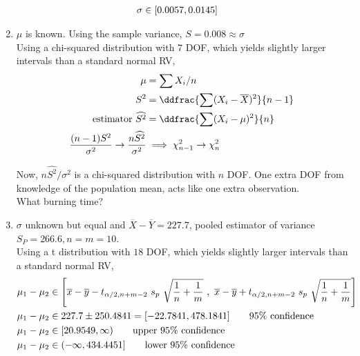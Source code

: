 \begin{enumerate}
	\begin{subequations}
		\begin{align}
			\sigma &\in [0.0057, 0.0145]
		\end{align}\\
	\end{subequations}

	\item  $ \mu $ is known. Using the sample variance, $ S = 0.008 \approx \sigma $\\
	Using a chi-squared distribution with $ 7 $ DOF, which yields slightly larger intervals than a standard normal RV,\\
	
	\begin{subequations}
		\begin{align}
			\mu &= \sum X_i / n \nonumber \\
			S^2 &= \ddfrac{\sum (X_i - \overline{X})^2}{n-1} \nonumber \\
			\text{estimator } \widehat{S^2} &= \ddfrac{\sum (X_i - \mu)^2}{n} \\
			\frac{(n-1)S^2}{\sigma^2} \to \frac{n\widehat{S^2}}{\sigma^2} &\implies \chi^2_{n-1} \to \chi^2_{n}
		\end{align}\\
	\end{subequations}
	
	Now, $ n \widehat{S^2} /\sigma^2 $ is a chi-squared distribution with $ n $ DOF. One extra DOF from knowledge of the population mean, acts like one extra observation.\\
	
	What burning time?\\
	
	\item  $ \sigma $ unknown but equal and $ \overline{X} - \overline{Y} = 227.7 $, pooled estimator of variance $ S_P = 266.6, n = m = 10$. \\
	Using a t distribution with $ 18 $ DOF, which yields slightly larger intervals than a standard normal RV,\\
	\begin{subequations}
		\begin{align}
			\mu_1 - \mu_2 &\in \left[ \overline{x} - \overline{y} - t_{\alpha / 2, n+m-2}\ s_p\ \sqrt{\frac{1}{n} + \frac{1}{m}}\ ,\ \overline{x} - \overline{y} + t_{\alpha / 2, n+m-2}\ s_p\ \sqrt{\frac{1}{n} + \frac{1}{m}} \right]  \nonumber \\
			\mu_1 - \mu_2 &\in 227.7 \pm 250.4841 = [-22.7841, 478.1841] \qquad \text{95\% confidence}  \nonumber \\
			\mu_1 - \mu_2 &\in  [20.9549, \infty) \qquad \text{upper 95\% confidence} \nonumber \\
			\mu_1 - \mu_2 &\in  (-\infty, 434.4451] \qquad \text{lower 95\% confidence} \nonumber 
		\end{align}\\
	\end{subequations}
	

\end{enumerate}
